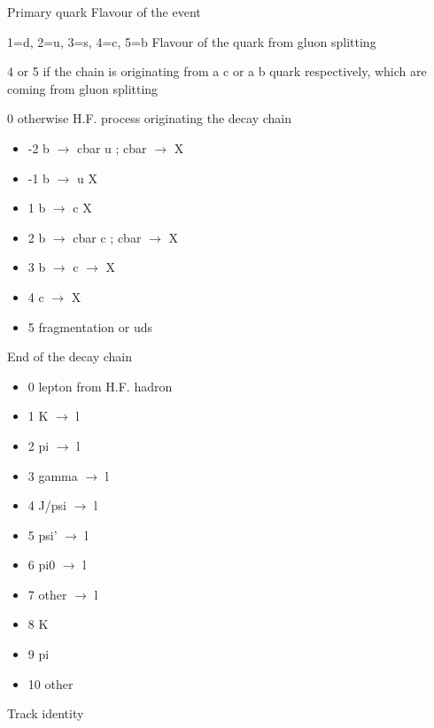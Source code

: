\begin{indentlist}{ 3.50cm}{ 3.75cm}
      Primary quark Flavour of the event
 
                              1=d, 2=u, 3=s, 4=c, 5=b
      Flavour of the quark from gluon splitting
 
                              4 or 5 if the chain is originating from a
                                     c or a b quark respectively, which
                                     are coming from gluon splitting
 
                              0      otherwise
     H.F. process originating the decay chain
 
\begin{itemize}
 
\item                         -2    b $\rightarrow$ cbar u ; cbar $\rightarrow$ X
\item                         -1    b $\rightarrow$ u X
\item                          1    b $\rightarrow$ c X
\item                          2    b $\rightarrow$ cbar c ; cbar $\rightarrow$ X
\item                          3    b $\rightarrow$ c $\rightarrow$ X
\item                          4    c $\rightarrow$ X
\item                          5    fragmentation or uds
\end{itemize}
     End of the decay chain
 
\begin{itemize}
\item                          0   lepton from H.F. hadron
\item                          1   K $\rightarrow$ l
\item                          2   pi $\rightarrow$ l
\item                          3   gamma $\rightarrow$ l
\item                          4   J/psi $\rightarrow$ l
\item                          5   psi' $\rightarrow$ l
\item                          6   pi0 $\rightarrow$ l
\item                          7   other $\rightarrow$ l
\item                          8   K
\item                          9   pi
\item                         10   other
\end{itemize}
     Track identity
 

\end{indentlist}
